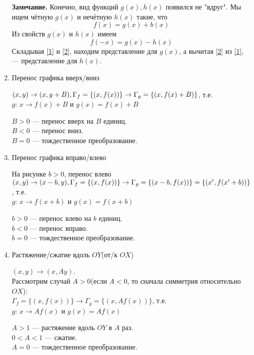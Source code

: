 \documentclass{article}
\begin{document}
\begin{enumerate}
        \textbf{Замечание.} Конечно, вид функций \(g(x), h(x)\) появился не "вдруг". Мы ищем чётную \(g(x)\) и нечётную \(h(x)\) такие, что
        \begin{equation}\label{1}
            f(x)=g(x)+b(x)
        \end{equation}
        Из свойств \(g(x)\) и \(h(x)\) имеем
        \begin{equation}\label{2}
            f(-x)=g(x)-h(x)
        \end{equation}
        Складывая \ref{1} и \ref{2}, находим представление для \(g(x)\), а вычитая \ref{2} из \ref{1}, --- представление для \(h(x)\).
        \item Перенос графика вверх/вниз

        \((x,y)\rightarrow(x, y+B),\\ \Gamma_f=\{(x,f(x))\} \rightarrow \Gamma_g=\{(x,f(x)+B)\}\), т.е.\\
        \(g\): \(x\rightarrow f(x)+B\) и \(g(x)=f(x)+B\)

        \(B>0\) --- перенос вверх на \(B\) единиц.\\
        \(B<0\) --- перенос вниз.\\
        \(B=0\) --- тождественное преобразование.
        \item Перенос графика вправо/влево

        На рисунке \(b>0\), перенос влево \((x,y)\rightarrow (x-b,y),\\
        \Gamma_f=\{(x,f(x))\}\rightarrow \Gamma_g = \{(x-b,f(x))\}=\{(x',f(x'+b))\}\), т.е.\\
        \(g\): \(x\rightarrow f(x+b)\) и \(g(x)=f(x+b)\)

        \(b>0\) --- перенос влево на \(b\) единиц.\\
        \(b<0\) --- перенос вправо.\\
        \(b=0\) --- тождественное преобразование.
        \item Растяжение/сжатие вдоль \(OY\)(от/к \(OX\))

        \((x,y)\rightarrow (x,Ay)\).\\
        Рассмотрим случай \(A>0\)(если \(A<0\), то сначала симметрия относительно \(OX\)):\\
        \(\Gamma_f=\{(x,f(x))\}\rightarrow \Gamma_g=\{(x,Af(x))\}\), т.е.\\
        \(g\): \(x \rightarrow Af(x)\) и \(g(x)=Af(x)\)

        \(A>1\) --- растяжение вдоль \(OY\) в \(A\) раз.\\
        \(0<A<1\) --- сжатие.\\
        \(A=0\) --- тождественное преобразование.
    \end{enumerate}
    
\end{document}
